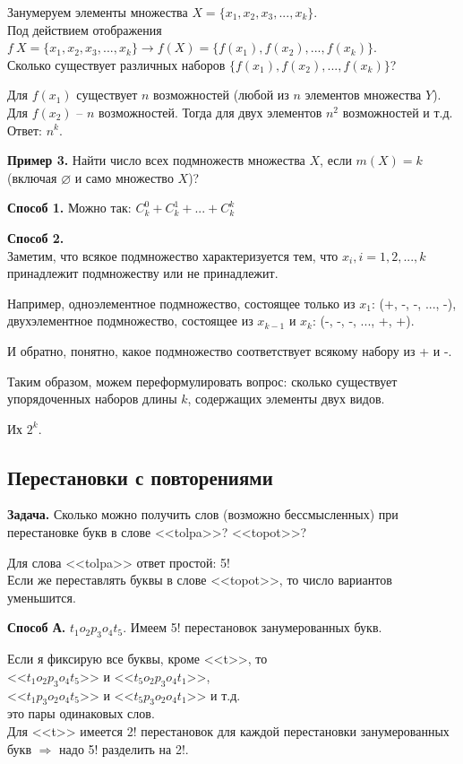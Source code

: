 \documentclass{article}
\begin{document}
    Занумеруем элементы множества \(X = \{x_1, x_2, x_3, ..., x_k\}\).
    \\Под действием отображения \(f\ X=\{x_1, x_2, x_3, ..., x_k\} \rightarrow f(X) = \{f(x_1), f(x_2), ..., f(x_k)\}\).
    \\Сколько существует различных наборов \(\{f(x_1), f(x_2), ..., f(x_k)\}\)?

    Для \(f(x_1)\) существует \(n\) возможностей (любой из \(n\) элементов множества \(Y\)). Для \(f(x_2)\) -- \(n\) возможностей.
    Тогда для двух элементов \(n^2\) возможностей и т.д. Ответ: \(n^k\).

    \textbf{Пример 3.} Найти число всех подмножеств множества \(X\), если \(m(X) = k\) (включая \(\varnothing\) и само множество \(X\))?

    \textbf{Способ 1.} Можно так: \(C_k^0 + C_k^1 + ... + C_k^k\)

    \textbf{Способ 2.}
    \\Заметим, что всякое подмножество характеризуется тем, что \(x_i, i = 1, 2, ..., k\) принадлежит подмножеству или не принадлежит.

    Например, одноэлементное подмножество, состоящее только из \(x_1\): (+, -, -, ..., -), двухэлементное подмножество, состоящее из \(x_{k-1}\) и \(x_k\): (-, -, -, ..., +, +).

    И обратно, понятно, какое подмножество соответствует всякому набору из + и -.

    Таким образом, можем переформулировать вопрос: сколько существует упорядоченных наборов длины \(k\), содержащих элементы двух видов.

    Их \(2^k\).

    \subsection{Перестановки с повторениями}

    \textbf{Задача.} Сколько можно получить слов (возможно бессмысленных) при перестановке букв в слове <<tolpa>>? <<topot>>?

    Для слова <<tolpa>> ответ простой: 5!
    \\Если же переставлять буквы в слове <<topot>>, то число вариантов уменьшится.

    \textbf{Способ А.} \(t_1 o_2 p_3 o_4 t_5\). Имеем 5! перестановок занумерованных букв.

    Если я фиксирую все буквы, кроме <<t>>, то 
    \\<<\(t_1 o_2 p_3 o_4 t_5\)>> и <<\(t_5 o_2 p_3 o_4 t_1\)>>,
    \\<<\(t_1 p_3 o_2 o_4 t_5\)>> и <<\(t_5 p_3 o_2 o_4 t_1\)>> и т.д.
    \\это пары одинаковых слов.
    \\Для <<t>> имеется 2! перестановок для каждой перестановки занумерованных букв \(\Rightarrow\) надо 5! разделить на 2!.
\end{document}
